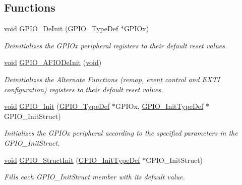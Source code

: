 \subsection*{Functions}
\begin{DoxyCompactItemize}
\item 
\hyperlink{usb__devapi_8h_afabf60e7f57651d6d595a02c75f07cd0}{void} \hyperlink{group___g_p_i_o___private___functions_gaa60bdf3182c44b5fa818f237042f52ee}{G\+P\+I\+O\+\_\+\+De\+Init} (\hyperlink{struct_g_p_i_o___type_def}{G\+P\+I\+O\+\_\+\+Type\+Def} $\ast$G\+P\+I\+Ox)
\begin{DoxyCompactList}\small\item\em Deinitializes the G\+P\+I\+Ox peripheral registers to their default reset values. \end{DoxyCompactList}\item 
\hyperlink{usb__devapi_8h_afabf60e7f57651d6d595a02c75f07cd0}{void} \hyperlink{group___g_p_i_o___private___functions_ga7f645e6b6146818c3d6c19021e70170c}{G\+P\+I\+O\+\_\+\+A\+F\+I\+O\+De\+Init} (\hyperlink{usb__devapi_8h_afabf60e7f57651d6d595a02c75f07cd0}{void})
\begin{DoxyCompactList}\small\item\em Deinitializes the Alternate Functions (remap, event control and E\+X\+TI configuration) registers to their default reset values. \end{DoxyCompactList}\item 
\hyperlink{usb__devapi_8h_afabf60e7f57651d6d595a02c75f07cd0}{void} \hyperlink{group___g_p_i_o___private___functions_ga71abf9404261370d03cca449b88d3a65}{G\+P\+I\+O\+\_\+\+Init} (\hyperlink{struct_g_p_i_o___type_def}{G\+P\+I\+O\+\_\+\+Type\+Def} $\ast$G\+P\+I\+Ox, \hyperlink{struct_g_p_i_o___init_type_def}{G\+P\+I\+O\+\_\+\+Init\+Type\+Def} $\ast$G\+P\+I\+O\+\_\+\+Init\+Struct)
\begin{DoxyCompactList}\small\item\em Initializes the G\+P\+I\+Ox peripheral according to the specified parameters in the G\+P\+I\+O\+\_\+\+Init\+Struct. \end{DoxyCompactList}\item 
\hyperlink{usb__devapi_8h_afabf60e7f57651d6d595a02c75f07cd0}{void} \hyperlink{group___g_p_i_o___private___functions_gab28de41278e7f8c63d0851e2733b10df}{G\+P\+I\+O\+\_\+\+Struct\+Init} (\hyperlink{struct_g_p_i_o___init_type_def}{G\+P\+I\+O\+\_\+\+Init\+Type\+Def} $\ast$G\+P\+I\+O\+\_\+\+Init\+Struct)
\begin{DoxyCompactList}\small\item\em Fills each G\+P\+I\+O\+\_\+\+Init\+Struct member with its default value. \end{DoxyCompactList}\item 

\end{DoxyCompactItemize}
